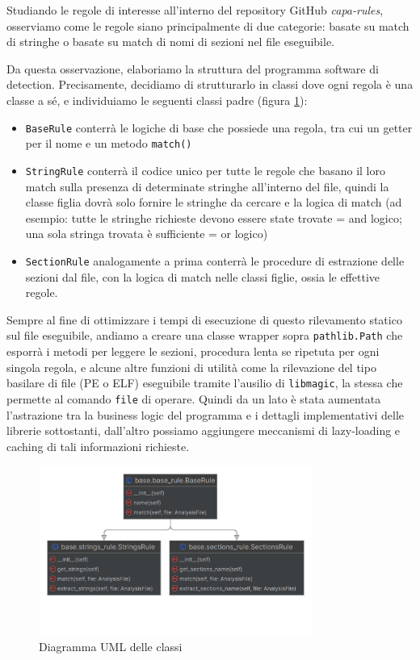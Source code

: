 Studiando le regole di interesse all'interno del repository GitHub \textit{capa-rules}, osserviamo come le regole siano principalmente di due categorie: basate su match di stringhe o basate su match di nomi di sezioni nel file eseguibile.

Da questa osservazione, elaboriamo la struttura del programma software di detection. Precisamente, decidiamo di strutturarlo in classi dove ogni regola è una classe a sé, e individuiamo le seguenti classi padre (figura \ref{fig:base_custom_static_analyzer_uml}):
\begin{itemize}
    \item \texttt{BaseRule} conterrà le logiche di base che possiede una regola, tra cui un getter per il nome e un metodo \texttt{match()}
    \item \texttt{StringRule} conterrà il codice unico per tutte le regole che basano il loro match sulla presenza di determinate stringhe all'interno del file, quindi la classe figlia dovrà solo fornire le stringhe da cercare e la logica di match (ad esempio: tutte le stringhe richieste devono essere state trovate = and logico; una sola stringa trovata è sufficiente = or logico)
    \item \texttt{SectionRule} analogamente a prima conterrà le procedure di estrazione delle sezioni dal file, con la logica di match nelle classi figlie, ossia le effettive regole.
\end{itemize}

Sempre al fine di ottimizzare i tempi di esecuzione di questo rilevamento statico sul file eseguibile,
andiamo a creare una classe wrapper sopra \texttt{pathlib.Path} che esporrà i metodi per leggere le sezioni, procedura lenta se ripetuta per ogni singola regola, e alcune altre funzioni di utilità come la rilevazione del tipo basilare di file (PE o ELF) eseguibile tramite l'ausilio di \texttt{libmagic}, la stessa che permette al comando \texttt{file} di operare.
Quindi da un lato è stata aumentata l'astrazione tra la business logic del programma e i dettagli implementativi delle librerie sottostanti, dall'altro possiamo aggiungere meccanismi di lazy-loading e caching di tali informazioni richieste.

\begin{figure}[H]
    \centering
    \includegraphics[width = 0.8\textwidth]{assets/base_custom_static_analyzer.png}
    \caption{Diagramma UML delle classi}
    \label{fig:base_custom_static_analyzer_uml}
\end{figure}


